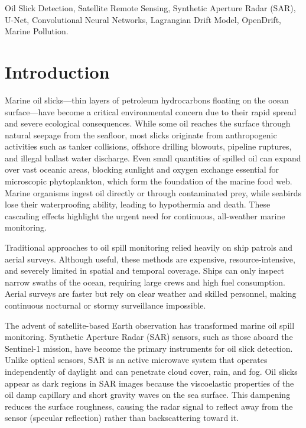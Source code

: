 \documentclass[conference]{IEEEtran}
\begin{document}
\begin{IEEEkeywords}
Oil Slick Detection, Satellite Remote Sensing, Synthetic Aperture Radar (SAR), U-Net, Convolutional Neural Networks, Lagrangian Drift Model, OpenDrift, Marine Pollution.
\end{IEEEkeywords}

\section{Introduction}
Marine oil slicks—thin layers of petroleum hydrocarbons floating on the ocean surface—have become a critical environmental concern due to their rapid spread and severe ecological consequences. While some oil reaches the surface through natural seepage from the seafloor, most slicks originate from anthropogenic activities such as tanker collisions, offshore drilling blowouts, pipeline ruptures, and illegal ballast water discharge. Even small quantities of spilled oil can expand over vast oceanic areas, blocking sunlight and oxygen exchange essential for microscopic phytoplankton, which form the foundation of the marine food web. Marine organisms ingest oil directly or through contaminated prey, while seabirds lose their waterproofing ability, leading to hypothermia and death. These cascading effects highlight the urgent need for continuous, all-weather marine monitoring.

Traditional approaches to oil spill monitoring relied heavily on ship patrols and aerial surveys. Although useful, these methods are expensive, resource-intensive, and severely limited in spatial and temporal coverage. Ships can only inspect narrow swaths of the ocean, requiring large crews and high fuel consumption. Aerial surveys are faster but rely on clear weather and skilled personnel, making continuous nocturnal or stormy surveillance impossible.

The advent of satellite-based Earth observation has transformed marine oil spill monitoring. Synthetic Aperture Radar (SAR) sensors, such as those aboard the Sentinel-1 mission, have become the primary instruments for oil slick detection. Unlike optical sensors, SAR is an active microwave system that operates independently of daylight and can penetrate cloud cover, rain, and fog. Oil slicks appear as dark regions in SAR images because the viscoelastic properties of the oil damp capillary and short gravity waves on the sea surface. This dampening reduces the surface roughness, causing the radar signal to reflect away from the sensor (specular reflection) rather than backscattering toward it.
\end{document}
